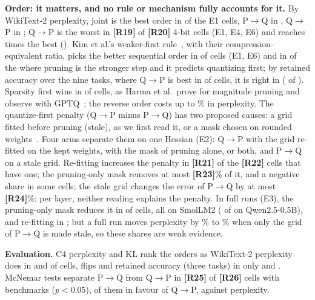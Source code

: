 \documentclass{esannV2}
\newcommand{\TBD}[1]{\textbf{[#1]}}
\newif\ifEthree \Ethreetrue
\newif\ifEsix   \Esixtrue
\providecommand{\resQTwoQPWorstPplBFour}{\TBD{R19}}
\providecommand{\resQTwoCellsPplBFour}{\TBD{R20}}
\providecommand{\resETwoRefitWorse}{\TBD{R21}}
\providecommand{\resETwoPenaltyCells}{\TBD{R22}}
\providecommand{\resETwoRemovedPmaskMaxPct}{\TBD{R23}}
\providecommand{\resETwoStaleMaxAbsPct}{\TBD{R24}}
\providecommand{\resMcNemarSigPQQP}{\TBD{R25}}
\providecommand{\resMcNemarCellsPQQP}{\TBD{R26}}
\begin{document}
\textbf{Order: it matters, and no rule or mechanism fully accounts for it.}
By WikiText-2 perplexity, joint is the best order in \resQTwoBestJointPpl{} of
the \resQTwoCellsPpl{} E1 cells, P$\to$Q in \resQTwoBestPQPpl{}, Q$\to$P in
\resQTwoBestQPPpl; Q$\to$P is the worst in \resQTwoQPWorstPplBFour{} of
\resQTwoCellsPplBFour{} 4-bit cells (E1, E4, E6) and reaches \resQTwoMaxRatio{}
times the best (\resQTwoMaxRatioWhere). Kim et al.'s weaker-first
rule~\cite{kim2026order}, with their compression-equivalent ratio, picks the
better sequential order in \resESevenKimCorrectPplAll{} of
\resESevenKimCellsPplAll{} cells (E1, E6) and in \resESevenKimPredQPCorrectPplAll{}
of the \resESevenKimPredQPPplAll{} where pruning is the stronger step and it
predicts quantizing first; by retained accuracy over the nine tasks, where Q$\to$P
is best in \resQTwoBestQPSrExt{} of \resQTwoCellsSrExt{} cells, it is right in
\resESevenKimCorrectSrAll{} (\resESevenKimPredQPCorrectSrAll{} of
\resESevenKimPredQPSrAll). Sparsity first wins in \resESevenHarmaPQBetterPplAll{}
of \resESevenHarmaOrderCellsPplAll{} cells, as Harma et al.\ prove for magnitude
pruning and observe with GPTQ~\cite{harma2025interplay}; the reverse order costs
up to \resESevenHarmaMaxGapPplAllPct\% in perplexity. The quantize-first
penalty (Q$\to$P minus P$\to$Q) has two proposed causes: a grid fitted
before pruning (stale), as we first read it, or a mask chosen on rounded
weights~\cite{harma2025interplay}. Four arms separate them on one Hessian (E2): Q$\to$P with the grid
re-fitted on the kept
weights, with the mask of pruning alone, or both, and P$\to$Q on a stale grid.
Re-fitting increases the penalty in \resETwoRefitWorse{} of the
\resETwoPenaltyCells{} cells that have one; the pruning-only mask removes at
most \resETwoRemovedPmaskMaxPct\% of it, and a negative share in some cells;
the stale grid changes the error of P$\to$Q by at most
\resETwoStaleMaxAbsPct\%: per layer, neither reading explains the
penalty.\ifEthree{} In full runs (E3), the pruning-only mask reduces it in
\resEThreePmaskHelps{} of \resEThreeCells{} cells, all on SmolLM2
(\resEThreePmaskHelpsQwen{} of \resEThreeCellsQwen{} on Qwen2.5-0.5B), and
re-fitting in \resEThreeRefitHelps; but a full run moves perplexity by
\resEThreeStaleMinPct\% to \resEThreeStaleMaxPct\% when only the grid of
P$\to$Q is made stale, so these shares are weak evidence.\fi


\textbf{Evaluation.} C4 perplexity and KL rank the orders as WikiText-2
perplexity does in \resQTwoAgreePplCFour{} and \resQTwoAgreeKl{} of
\resQTwoAgreeCells{} cells, flips and retained accuracy (three tasks) in only
\resQTwoAgreeFlips{} and \resQTwoAgreeSrThree.\ifEsix\else{} Flips show what retained accuracy hides:
4-bit SmolLM2-135M keeps \resSrThreeSmolSmallQuantBFour{} of the dense
accuracy (Sr~\cite{laborde2025semantic}, three tasks) but flips
\resFlipsPctSmolSmallQuantBFour\% of its answers.\fi{}
McNemar tests separate P$\to$Q from Q$\to$P in \resMcNemarSigPQQP{} of
\resMcNemarCellsPQQP{} cells with benchmarks ($p<0.05$), \resMcNemarSigFavourQP{}
of them in favour of Q$\to$P, against perplexity.
\end{document}
